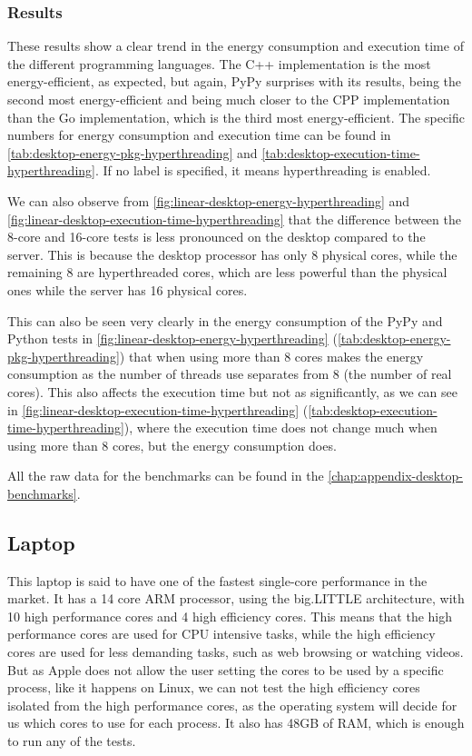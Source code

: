 \subsubsection{Results}






These results show a clear trend in the energy consumption and execution time of the different programming languages. The C++ implementation is the most energy-efficient, as expected, but again, PyPy surprises with its results, being the second most energy-efficient and being much closer to the \gls{CPP} implementation than the Go implementation, which is the third most energy-efficient. The specific numbers for energy consumption and execution time can be found in \autoref{tab:desktop-energy-pkg-hyperthreading} and \autoref{tab:desktop-execution-time-hyperthreading}. If no label is specified, it means hyperthreading is enabled.

We can also observe from \autoref{fig:linear-desktop-energy-hyperthreading} and \autoref{fig:linear-desktop-execution-time-hyperthreading} that the difference between the 8-core and 16-core tests is less pronounced on the desktop compared to the server. This is because the desktop processor has only 8 physical cores, while the remaining 8 are hyperthreaded cores, which are less powerful than the physical ones while the server has 16 physical cores.

This can also be seen very clearly in the energy consumption of the PyPy and Python tests in \autoref{fig:linear-desktop-energy-hyperthreading} (\autoref{tab:desktop-energy-pkg-hyperthreading}) that when using more than 8 cores makes the energy consumption as the number of threads use separates from 8 (the number of real cores). This also affects the execution time but not as significantly, as we can see in \autoref{fig:linear-desktop-execution-time-hyperthreading} (\autoref{tab:desktop-execution-time-hyperthreading}), where the execution time does not change much when using more than 8 cores, but the energy consumption does.

All the raw data for the benchmarks can be found in the \autoref{chap:appendix-desktop-benchmarks}.

\subsection{Laptop}
This laptop is said to have one of the fastest single-core performance in the market. It has a 14 core \gls{ARM} processor, using the big.LITTLE architecture, with 10 high performance cores and 4 high efficiency cores. This means that the high performance cores are used for CPU intensive tasks, while the high efficiency cores are used for less demanding tasks, such as web browsing or watching videos. But as Apple does not allow the user setting the cores to be used by a specific process, like it happens on Linux, we can not test the high efficiency cores isolated from the high performance cores, as the operating system will decide for us which cores to use for each process. It also has 48GB of RAM, which is enough to run any of the tests.


